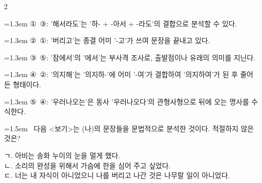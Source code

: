 \documentclass[10pt, a4paper]{article}
\begin{document}
\begin{multicols}{2}
\begin{minipage}{\columnwidth}
\vspace{0.5mm}
{\hangindent=1.3em  \noindent\hspace{0.3em}①~③: '해서라도'는 '하- + -아서 + -라도'의 결합으로 분석할 수 있다.\par}
{\hangindent=1.3em  \noindent\hspace{0.3em}②~①: '버리고'는 종결 어미 '-고'가 쓰여 문장을 끝내고 있다.\par}
{\hangindent=1.3em  \noindent\hspace{0.3em}③~⑤: '잠에서'의 '에서'는 부사격 조사로, 출발점이나 유래의 의미를 지닌다.\par}
{\hangindent=1.3em  \noindent\hspace{0.3em}④~②: '의지해'는 '의지하-'에 어미 '-여'가 결합하여 '의지하여'가 된 후 줄어든 형태이다.\par}
{\hangindent=1.3em  \noindent\hspace{0.3em}⑤~④: '우러나오는'은 동사 '우러나오다'의 관형사형으로 뒤에 오는 명사를 수식한다.\par}
\vspace{4mm}
\end{minipage}
\par

\noindent\begin{minipage}{\columnwidth}
\vspace{2mm}
{\hangindent=1.5em  ~다음 <보기>는 (나)의 문장들을 문법적으로 분석한 것이다. 적절하지 않은 것은?\par}

\vspace{1mm}
\begin{boxibox}
ㄱ. 아비는 송화 누이의 눈을 멀게 했다. \\
ㄴ. 소리의 완성을 위해서 가슴에 한을 심어 주고 싶었다. \\
ㄷ. 너는 내 자식이 아니었으니 나를 버리고 나간 것은 나무랄 일이 아니었다. \\
\end{boxibox}
\vspace{1mm}


\end{minipage}
\end{multicols}
\end{document}
